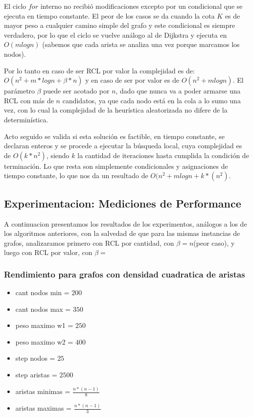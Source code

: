 \vspace{2mm}
   
   El ciclo $for$ interno no recibi\'o modificaciones excepto por un condicional que se ejecuta en tiempo constante. El peor de los casos se da cuando la cota $K$ es de mayor peso a cualquier camino simple del grafo y este condicional es siempre verdadero, por lo que el ciclo se vuelve an\'alogo al de Dijkstra y ejecuta en $O(mlogn)$ (sabemos que cada arista se analiza una vez porque marcamos los nodos).

\vspace{2mm}

Por lo tanto en caso de ser RCL por valor la complejidad es de: $O(n^2 + m * logn + \beta * n )$ y en caso de ser por valor es de $O(n^2 + m log n)$. El par\'ametro $\beta$ puede ser acotado por $n$, dado que nunca va a poder armarse una RCL con m\'as de $n$ candidatos, ya que cada nodo est\'a en la cola a lo sumo una vez, con lo cual la complejidad de la heur\'istica aleatorizada no difere de la determin\'istica.


\vspace{2mm}

Acto seguido se valida si esta soluci\'on es factible, en tiempo constante, se declaran enteros y se procede a ejecutar la b\'usqueda local, cuya complejidad es de $O(k*n^2)$, siendo $k$ la cantidad de iteraciones hasta cumplida la condici\'on de terminaci\'on. Lo que resta son simplemente condicionales y asignaciones de tiempo constante, lo que nos da un resultado de $O(n^2 + m log n + k*(n^2)$.

\subsection{Experimentacion: Mediciones de Performance}

A continuacion presentamos los resultados de los experimentos, an\'alogos a los de los algoritmos anteriores, con la salvedad de que para las mismas instancias de grafos, analizaramos primero con RCL por cantidad, con $\beta=n$(peor caso), y luego con RCL por valor, con $\beta=$

\subsubsection{Rendimiento para grafos con densidad cuadratica de aristas}
\begin{itemize}
	\item cant nodos min = $200$
	\item cant nodos max = $350$
	\item peso maximo w1 = $250$
	\item peso maximo w2 = $400$
	\item step nodos = $25$
	\item step aristas = $2500$
	\item aristas minimas = $\frac{n*(n-1)}{8}$
	\item aristas maximas = $\frac{n*(n-1)}{3}$
\end{itemize}								

